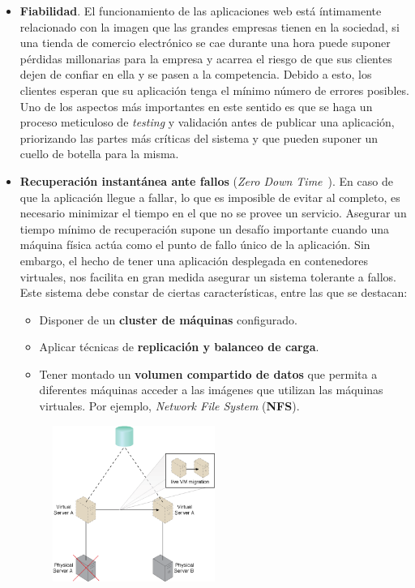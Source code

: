 \begin{itemize}
\item \textbf{Fiabilidad}. El funcionamiento de las aplicaciones web está íntimamente relacionado con la imagen que las grandes empresas tienen en la sociedad, si una tienda de comercio electrónico se cae durante una hora puede suponer pérdidas millonarias para la empresa y acarrea el riesgo de que sus clientes dejen de confiar en ella y se pasen a la competencia. Debido a esto, los clientes esperan que su aplicación tenga el mínimo número de errores posibles. Uno de los aspectos más importantes en este sentido es que se haga un proceso meticuloso de \textit{testing} y validación antes de publicar una aplicación, priorizando las partes más críticas del sistema y que pueden suponer un cuello de botella para la misma.
\item \textbf{Recuperación instantánea ante fallos} (\emph{Zero Down Time}~\cite{zdwt}). En caso de que la aplicación llegue a fallar, lo que es imposible de evitar al completo, es necesario minimizar el tiempo en el que no se provee un servicio. Asegurar un tiempo mínimo de recuperación supone un desafío importante cuando una máquina física actúa como el punto de fallo único de la aplicación. Sin embargo, el hecho de tener una aplicación desplegada en contenedores virtuales, nos facilita en gran medida asegurar un sistema tolerante a fallos. Este sistema debe constar de ciertas características, entre las que se destacan:
\begin{itemize}
\item Disponer de un \textbf{cluster de máquinas} configurado.
\item Aplicar técnicas de \textbf{replicación y balanceo de carga}.
\item Tener montado un \textbf{volumen compartido de datos} que permita a diferentes máquinas acceder a las imágenes que utilizan las máquinas virtuales. Por ejemplo, \emph{Network File System} (\textbf{NFS}).
\end{itemize}
\begin{figure}
\centering
\includegraphics[width=0.5\textwidth]{spof.png}

\end{figure}
\end{itemize}
